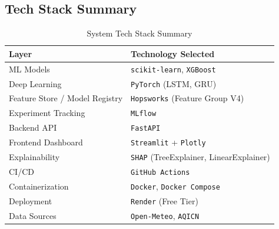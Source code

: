 \documentclass[11pt,a4paper]{article}
\begin{document}
\subsection*{Tech Stack Summary}
\begin{table}[h!]
\centering
\small
\begin{tabularx}{\textwidth}{l X}
\toprule
\textbf{Layer} & \textbf{Technology Selected} \\
\midrule
ML Models & \texttt{scikit-learn}, \texttt{XGBoost} \\
Deep Learning & \texttt{PyTorch} (LSTM, GRU) \\
Feature Store / Model Registry & \texttt{Hopsworks} (Feature Group V4) \\
Experiment Tracking & \texttt{MLflow} \\
Backend API & \texttt{FastAPI} \\
Frontend Dashboard & \texttt{Streamlit} + \texttt{Plotly} \\
Explainability & \texttt{SHAP} (TreeExplainer, LinearExplainer) \\
CI/CD & \texttt{GitHub Actions} \\
Containerization & \texttt{Docker}, \texttt{Docker Compose} \\
Deployment & \texttt{Render} (Free Tier) \\
Data Sources & \texttt{Open-Meteo}, \texttt{AQICN} \\
\bottomrule
\end{tabularx}
\caption{System Tech Stack Summary}
\label{tab:tech_stack}
\end{table}
\end{document}
